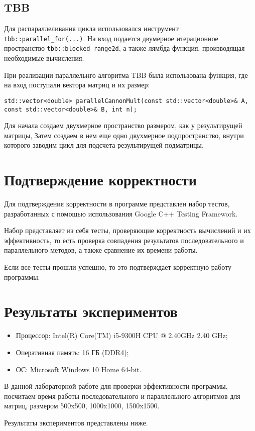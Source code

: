 \documentclass{report}
\begin{document}
\subsection*{TBB}
\par Для распараллеливания цикла использовался инструмент \verb|tbb::parallel_for(...)|. На вход подается двумерное итерационное пространство \verb|tbb::blocked_range2d|, а также лямбда-функция, производящая необходимые вычисления.
\par При реализации параллельнго алгоритма TBB была использована функция, где на вход поступали вектора матриц и их размер:
\begin{lstlisting}
std::vector<double> parallelCannonMult(const std::vector<double>& A, const std::vector<double>& B, int n);
\end{lstlisting}
\par Для начала создаем двухмерное пространство размером, как у результирущей матрицы, Затем создаем в нем еще одно двухмерное подпространство, внутри которого заводим цикл для подсчета результирущей подматрицы.
\newpage

\section*{Подтверждение корректности}
Для подтверждения корректности в программе представлен набор тестов, разработанных с помощью использования Google C++ Testing Framework.
\par Набор представляет из себя тесты, проверяющие корректность вычислений и их эффективность, то есть проверка совпадения результатов последовательного и параллельного методов, а также сравнение их времени работы.
\par Если все тесты прошли успешно, то это подтверждает корректную работу программы.
\newpage

\section*{Результаты экспериментов}
\begin{itemize}
\item Процессор: Intel(R) Core(TM) i5-9300H CPU @ 2.40GHz   2.40 GHz;
\item Оперативная память: 16 ГБ (DDR4);
\item ОС: Microsoft Windows 10 Home 64-bit.
\end{itemize}
\par В данной лабораторной работе для проверки эффективности программы, посчитаем время работы последовательного и параллельного алгоритмов для матриц, размером 500x500, 1000x1000, 1500x1500.
\par Результаты экспериментов представлены ниже.
\end{document}
